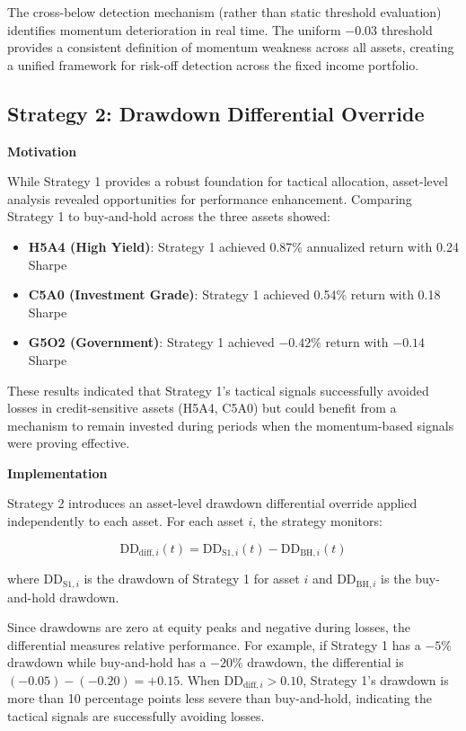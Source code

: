 \documentclass[11pt, letterpaper]{article}
\begin{document}
The cross-below detection mechanism (rather than static threshold evaluation) identifies momentum deterioration in real time. The uniform $-0.03$ threshold provides a consistent definition of momentum weakness across all assets, creating a unified framework for risk-off detection across the fixed income portfolio.

\subsection{Strategy 2: Drawdown Differential Override}

\textbf{Motivation}

While Strategy 1 provides a robust foundation for tactical allocation, asset-level analysis revealed opportunities for performance enhancement. Comparing Strategy 1 to buy-and-hold across the three assets showed:

\begin{itemize}
    \item \textbf{H5A4 (High Yield)}: Strategy 1 achieved 0.87\% annualized return with 0.24 Sharpe
    \item \textbf{C5A0 (Investment Grade)}: Strategy 1 achieved 0.54\% return with 0.18 Sharpe
    \item \textbf{G5O2 (Government)}: Strategy 1 achieved $-0.42\%$ return with $-0.14$ Sharpe
\end{itemize}

These results indicated that Strategy 1's tactical signals successfully avoided losses in credit-sensitive assets (H5A4, C5A0) but could benefit from a mechanism to remain invested during periods when the momentum-based signals were proving effective.

\textbf{Implementation}

Strategy 2 introduces an asset-level drawdown differential override applied independently to each asset. For each asset $i$, the strategy monitors:

\begin{equation}
\text{DD}_{\text{diff},i}(t) = \text{DD}_{\text{S1},i}(t) - \text{DD}_{\text{BH},i}(t)
\end{equation}

where $\text{DD}_{\text{S1},i}$ is the drawdown of Strategy 1 for asset $i$ and $\text{DD}_{\text{BH},i}$ is the buy-and-hold drawdown.

Since drawdowns are zero at equity peaks and negative during losses, the differential measures relative performance. For example, if Strategy 1 has a $-5\%$ drawdown while buy-and-hold has a $-20\%$ drawdown, the differential is $(-0.05) - (-0.20) = +0.15$. When $\text{DD}_{\text{diff},i} > 0.10$, Strategy 1's drawdown is more than 10 percentage points less severe than buy-and-hold, indicating the tactical signals are successfully avoiding losses.
\end{document}
